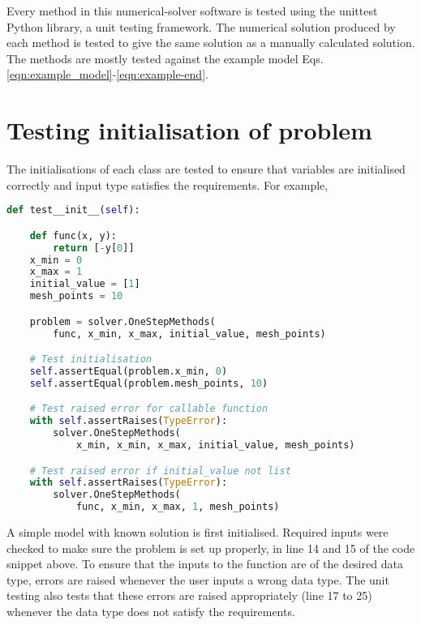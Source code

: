 Every method in this numerical-solver software is tested using the unittest Python library, a unit testing framework. The numerical solution produced by each method is tested to give the same solution as a manually calculated solution. The methods are mostly tested against the example model Eqs. \eqref{eqn:example_model}-\eqref{eqn:example-end}.

\section{Testing initialisation of problem}
\label{sec:test_init}
The initialisations of each class are tested to ensure that variables are initialised correctly and input type satisfies the requirements. For example, 

\begin{lstlisting}[language=Python, caption= {initialisation testing}, title={Testing initialisation of problem}, label={code:test_init}]
def test__init__(self):

    def func(x, y):
        return [-y[0]]
    x_min = 0
    x_max = 1
    initial_value = [1]
    mesh_points = 10

    problem = solver.OneStepMethods(
        func, x_min, x_max, initial_value, mesh_points)

    # Test initialisation
    self.assertEqual(problem.x_min, 0)
    self.assertEqual(problem.mesh_points, 10)

    # Test raised error for callable function
    with self.assertRaises(TypeError):
        solver.OneStepMethods(
            x_min, x_min, x_max, initial_value, mesh_points)

    # Test raised error if initial_value not list
    with self.assertRaises(TypeError):
        solver.OneStepMethods(
            func, x_min, x_max, 1, mesh_points)
\end{lstlisting}
A simple model with known solution is first initialised. Required inputs were checked to make sure the problem is set up properly, in line 14 and 15 of the code snippet above. To ensure that the inputs to the function are of the desired data type, errors are raised whenever the user inputs a wrong data type. The unit testing also tests that these errors are raised appropriately (line 17 to 25) whenever the data type does not satisfy the requirements. 

